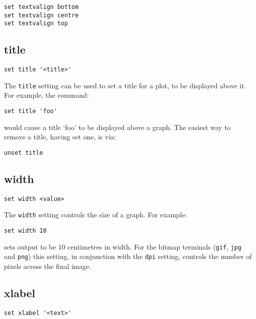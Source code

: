 \begin{verbatim}
set textvalign bottom 
set textvalign centre
set textvalign top
\end{verbatim}

\subsection{title}

\begin{verbatim}
set title '<title>'
\end{verbatim}

The {\tt title} setting can be used to set a title for a plot, to be displayed
above it.  For example, the command:

\begin{verbatim}
set title 'foo'
\end{verbatim}

\noindent would cause a title `foo' to be displayed above a graph. The easiest
way to remove a title, having set one, is via:

\begin{verbatim}
unset title
\end{verbatim}
   
\subsection{width}

\begin{verbatim}
set width <value>
\end{verbatim}

The {\tt width} setting controls the size of a graph.  For example:

\begin{verbatim}
set width 10
\end{verbatim}

\noindent sets output to be 10 centimetres in width.  For the bitmap terminals ({\tt gif},
{\tt jpg} and {\tt png}) this setting, in conjunction with the {\tt dpi}
setting, controls the number of pixels across the final image.

\subsection{xlabel}

\begin{verbatim}
set xlabel '<text>'
\end{verbatim}

